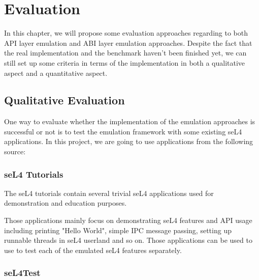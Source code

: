\chapter{Evaluation}\label{ch:eval}

In this chapter, we will propose some evaluation approaches regarding to both API layer emulation and ABI layer emulation approaches. Despite the fact that the real implementation and the benchmark haven't been finished yet, we can still set up some criteria in terms of the implementation in both a qualitative aspect and a quantitative aspect. 

\section{Qualitative Evaluation} 

One way to evaluate whether the implementation of the emulation approaches is successful or not is to test the emulation framework with some existing seL4 applications. In this project, we are going to use applications from the following source:



\subsection{seL4 Tutorials}

The seL4 tutorials contain several trivial seL4 applications used for demonstration and education purposes.

Those applications mainly focus on demonstrating seL4 features and API usage including printing "Hello World", simple IPC message passing, setting up runnable threads in seL4 userland and so on. Those applications can be used to use to test each of the emulated seL4 features separately.

\subsection{seL4Test}


